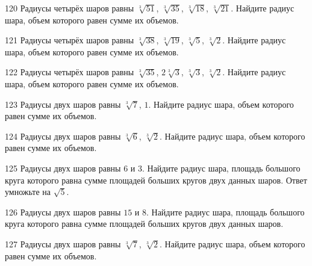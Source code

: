 \documentclass[a4paper]{article}
\begin{document}
\begin{taskBN}{120}
Радиусы четырёх шаров равны $\sqrt[3]{51}$, $\sqrt[3]{35}$, $\sqrt[3]{18}$, $\sqrt[3]{21}$. Найдите радиус шара, объем которого равен сумме их объемов.
\end{taskBN}

\begin{taskBN}{121}
Радиусы четырёх шаров равны $\sqrt[3]{38}$, $\sqrt[3]{19}$, $\sqrt[3]{5}$, $\sqrt[3]{2}$. Найдите радиус шара, объем которого равен сумме их объемов.
\end{taskBN}

\begin{taskBN}{122}
Радиусы четырёх шаров равны $\sqrt[3]{35}$, $2\sqrt[3]{3}$, $\sqrt[3]{3}$, $\sqrt[3]{2}$. Найдите радиус шара, объем которого равен сумме их объемов.
\end{taskBN}

\begin{taskBN}{123}
Радиусы двух шаров равны $\sqrt[3]{7}$, $1$. Найдите радиус шара, объем которого равен сумме их объемов.
\end{taskBN}

\begin{taskBN}{124}
Радиусы двух шаров равны $\sqrt[3]{6}$, $\sqrt[3]{2}$. Найдите радиус шара, объем которого равен сумме их объемов.
\end{taskBN}

\begin{taskBN}{125}
Радиусы двух шаров равны $6$ и $3$. Найдите радиус шара, площадь большого круга которого равна сумме площадей больших кругов двух данных шаров. Ответ умножьте на $\sqrt{5}$.
\end{taskBN}

\begin{taskBN}{126}
Радиусы двух шаров равны $15$ и $8$. Найдите радиус шара, площадь большого круга которого равна сумме площадей больших кругов двух данных шаров.
\end{taskBN}

\begin{taskBN}{127}
Радиусы двух шаров равны $\sqrt[3]{7}$, $\sqrt[3]{2}$. Найдите радиус шара, объем которого равен сумме их объемов.
\end{taskBN}
\end{document}
